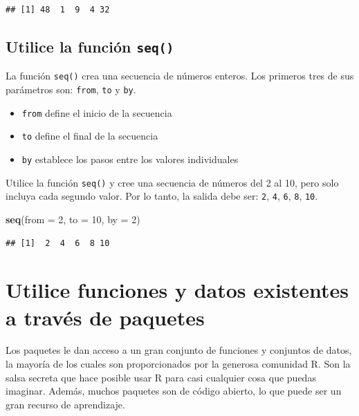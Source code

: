 \documentclass[
]{book}
\newenvironment{Shaded}{\begin{snugshade}}{\end{snugshade}}
\newcommand{\DataTypeTok}[1]{\textcolor[rgb]{0.13,0.29,0.53}{#1}}
\newcommand{\DecValTok}[1]{\textcolor[rgb]{0.00,0.00,0.81}{#1}}
\newcommand{\KeywordTok}[1]{\textcolor[rgb]{0.13,0.29,0.53}{\textbf{#1}}}
\newcommand{\NormalTok}[1]{#1}
\providecommand{\tightlist}{%
  \setlength{\itemsep}{0pt}\setlength{\parskip}{0pt}}
\begin{document}
\begin{verbatim}
## [1] 48  1  9  4 32
\end{verbatim}

\hypertarget{utilice-la-funciuxf3n-seq}{%
\subsection{\texorpdfstring{Utilice la función \texttt{seq()}}{Utilice la función seq()}}\label{utilice-la-funciuxf3n-seq}}

La función \texttt{seq()} crea una secuencia de números enteros. Los primeros tres de sus parámetros son: \texttt{from}, \texttt{to} y \texttt{by}.

\begin{itemize}
\tightlist
\item
  \texttt{from} define el inicio de la secuencia
\item
  \texttt{to} define el final de la secuencia
\item
  \texttt{by} establece los pasos entre los valores individuales
\end{itemize}

Utilice la función \texttt{seq()} y cree una secuencia de números del 2 al 10, pero solo incluya cada segundo valor. Por lo tanto, la salida debe ser: \texttt{2}, \texttt{4}, \texttt{6}, \texttt{8}, \texttt{10}.

\begin{Shaded}
\begin{Highlighting}[]
\KeywordTok{seq}\NormalTok{(}\DataTypeTok{from =} \DecValTok{2}\NormalTok{, }\DataTypeTok{to =} \DecValTok{10}\NormalTok{, }\DataTypeTok{by =} \DecValTok{2}\NormalTok{)}
\end{Highlighting}
\end{Shaded}

\begin{verbatim}
## [1]  2  4  6  8 10
\end{verbatim}

\hypertarget{utilice-funciones-y-datos-existentes-a-travuxe9s-de-paquetes}{%
\section{Utilice funciones y datos existentes a través de paquetes}\label{utilice-funciones-y-datos-existentes-a-travuxe9s-de-paquetes}}

Los paquetes le dan acceso a un gran conjunto de funciones y conjuntos de datos, la mayoría de los cuales son proporcionados por la generosa comunidad R. Son la salsa secreta que hace posible usar R para casi cualquier cosa que puedas imaginar. Además, muchos paquetes son de código abierto, lo que puede ser un gran recurso de aprendizaje.
\end{document}
